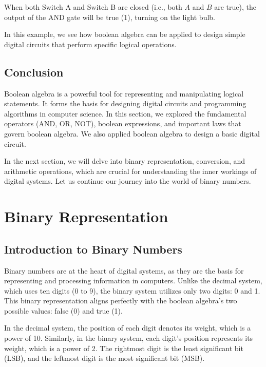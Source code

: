 \documentclass{article}
\begin{document}
When both Switch A and Switch B are closed (i.e., both $A$ and $B$ are true), the output of the AND gate will be true (1), turning on the light bulb.

In this example, we see how boolean algebra can be applied to design simple digital circuits that perform specific logical operations.

\subsection{Conclusion}

Boolean algebra is a powerful tool for representing and manipulating logical statements. It forms the basis for designing digital circuits and programming algorithms in computer science. In this section, we explored the fundamental operators (AND, OR, NOT), boolean expressions, and important laws that govern boolean algebra. We also applied boolean algebra to design a basic digital circuit.

In the next section, we will delve into binary representation, conversion, and arithmetic operations, which are crucial for understanding the inner workings of digital systems. Let us continue our journey into the world of binary numbers.

\newpage

\section{Binary Representation}

\subsection{Introduction to Binary Numbers}

Binary numbers are at the heart of digital systems, as they are the basis for representing and processing information in computers. Unlike the decimal system, which uses ten digits (0 to 9), the binary system utilizes only two digits: 0 and 1. This binary representation aligns perfectly with the boolean algebra's two possible values: false (0) and true (1).

In the decimal system, the position of each digit denotes its weight, which is a power of 10. Similarly, in the binary system, each digit's position represents its weight, which is a power of 2. The rightmost digit is the least significant bit (LSB), and the leftmost digit is the most significant bit (MSB).
\end{document}
